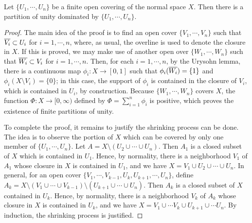 \begin{thm}
    Let $\{U_1, \cdots, U_n\}$ be a finite open covering of the normal space $X$.
    Then there is a partition of unity dominated by $\{U_1, \cdots, U_n\}$.
\end{thm}
\begin{proof}
    The main idea of the proof is to find an open cover $\{V_1, \cdots, V_n\}$ such that $\overline{V_i}\subset U_i$ for $i=1, \cdots, n$, where, as usual, the overline is used to denote the closure in $X$.
    If this is proved, we may make use of another open over $\{W_1, \cdots, W_n\}$ such that $\overline{W_i}\subset V_i$ for $i=1, \cdots, n$.
    Then, for each $i=1, \cdots, n$, by the Urysohn lemma, there is a continuous map $\phi_i: X\rightarrow [0, 1]$ such that $\phi_i(\overline{W_i})=\{1\}$ and $\phi_i(X\setminus V_i)=\{0\}$; in this case, the support of $\phi_i$ is contained in the closure of $V_i$, which is contained in $U_i$, by construction.
    Because $\{W_1, \cdots, W_n\}$ covers $X$, the function $\Phi: X\rightarrow[0, \infty)$ defined by $\Phi=\sum_{i=1}^n \phi_i$ is positive, which proves the existence of finite partitions of unity.

    To complete the proof, it remains to justify the shrinking process can be done.
    The idea is to observe the portion of $X$ which can be covered by only one member of $\{U_1, \cdots, U_n\}$.
    Let $A=X\setminus(U_2\cup\cdots\cup U_n)$.
    Then $A_1$ is a closed subset of $X$ which is contained in $U_1$.
    Hence, by normality, there is a neighborhood $V_1$ of $A_1$ whose closure in $X$ is contained in $U_1$, and we have $X=V_1\cup U_2\cup\cdots\cup U_n$.
    In general, for an open cover $\{V_1, \cdots, V_{k-1}, U_k, U_{k+1}, \cdots, U_n\}$, define $A_k=X\setminus(V_1\cup\cdots\cup V_{k-1})\setminus(U_{k+1}\cup\cdots\cup U_n)$.
    Then $A_k$ is a closed subset of $X$ contained in $U_k$.
    Hence, by normality, there is a neighborhood $V_k$ of $A_k$ whose closure in $X$ is contained in $U_k$, and we have $X=V_1\cup\cdots V_k\cup U_{k+1}\cup\cdots U_n$.
    By induction, the shrinking process is justified.
\end{proof}
